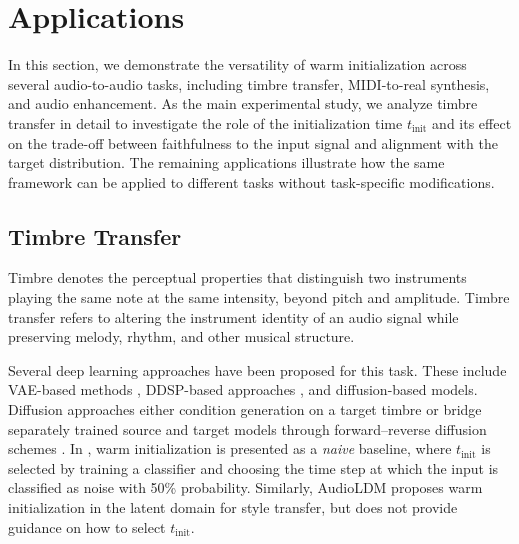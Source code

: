 \documentclass[twoside,a4paper]{article}
\begin{document}
\section{Applications}
\label{Experiments}
In this section, we demonstrate the versatility of warm initialization across several audio-to-audio tasks, including timbre transfer, MIDI-to-real synthesis, and audio enhancement. As the main experimental study, we analyze timbre transfer in detail to investigate the role of the initialization time $t_\text{init}$ and its effect on the trade-off between faithfulness to the input signal and alignment with the target distribution. The remaining applications illustrate how the same framework can be applied to different tasks without task-specific modifications.

\subsection{Timbre Transfer}
Timbre denotes the perceptual properties that distinguish two instruments playing the same note at the same intensity, beyond pitch and amplitude. Timbre transfer refers to altering the instrument identity of an audio signal while preserving melody, rhythm, and other musical structure.

Several deep learning approaches have been proposed for this task. These include VAE-based methods \cite{esling2018generativetimbrespacesregularizing, caillon2021ravevariationalautoencoderfast, colonel2020conditioningautoencoderlatentspaces}, DDSP-based approaches \cite{carney2021tonetransfer}, and diffusion-based models. Diffusion approaches either condition generation on a target timbre \cite{ baoueb2024wavetransferflexibleendtoendmultiinstrument, comanducci2023timbretransferusingimagetoimage, garcía2025sketch2soundcontrollableaudiogeneration, li2024musicstyletransfertimevarying, huang2024musicstyletransferdiffusion} or bridge separately trained source and target models through forward–reverse diffusion schemes \cite{mancusi2025latentdiffusionbridgesunsupervised}. In \cite{lee2026diffusiontimbretransfermutual}, warm initialization is presented as a \textit{naive} baseline, where $t_\text{init}$ is selected by training a classifier and choosing the time step at which the input is classified as noise with 50\% probability. Similarly, AudioLDM \cite{liu2023audioldm} proposes
warm initialization in the latent domain for style transfer, but does not provide guidance on how to select $t_\text{init}$.
\end{document}
